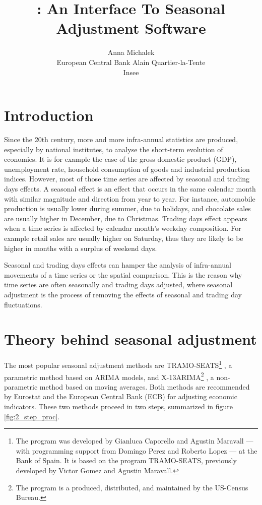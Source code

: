 \documentclass[article]{jss}
\author{
Anna Michalek\\European Central Bank \And Alain Quartier-la-Tente\\Insee
}
\title{\pkg{RJDemetra}: An \proglang{R} Interface To \proglang{JDemetra+}
Seasonal Adjustment Software}
\begin{document}
\hypertarget{introduction}{%
\section{Introduction}\label{introduction}}

Since the 20th century, more and more infra-annual statistics are
produced, especially by national institutes, to analyse the short-term
evolution of economies. It is for example the case of the gross domestic
product (GDP), unemployment rate, household consumption of goods and
industrial production indices. However, most of those time series are
affected by seasonal and trading days effects. A seasonal effect is an
effect that occurs in the same calendar month with similar magnitude and
direction from year to year. For instance, automobile production is
usually lower during summer, due to holidays, and chocolate sales are
usually higher in December, due to Christmas. Trading days effect
appears when a time series is affected by calendar month's weekday
composition. For example retail sales are usually higher on Saturday,
thus they are likely to be higher in months with a surplus of weekend
days.

Seasonal and trading days effects can hamper the analysis of
infra-annual movements of a time series or the spatial comparison. This
is the reason why time series are often seasonally and trading days
adjusted, where seasonal adjustment is the process of removing the
effects of seasonal and trading day fluctuations.

\hypertarget{theory-behind-seasonal-adjustment}{%
\section{Theory behind seasonal
adjustment}\label{theory-behind-seasonal-adjustment}}

The most popular seasonal adjustment methods are TRAMO-SEATS\footnote{The
  program  was developed by Gianluca Caporello and
  Agustin Maravall --- with programming support from Domingo Perez and
  Roberto Lopez --- at the Bank of Spain. It is based on the program
  TRAMO-SEATS, previously developed by Victor Gomez and Agustin
  Maravall.} \citep{gomez1996programs, caporello2004program}, a
parametric method based on ARIMA models, and X-13ARIMA\footnote{The
  program  is a produced, distributed, and
  maintained by the US-Census Bureau.}
\citep{findleyx12, ladiray1999x11en}, a non-parametric method based on
moving averages. Both methods are recommended by Eurostat and the
European Central Bank (ECB) for adjusting economic indicators. These two
methods proceed in two steps, summarized in figure
\ref{fig:2_step_proc}.
\end{document}
